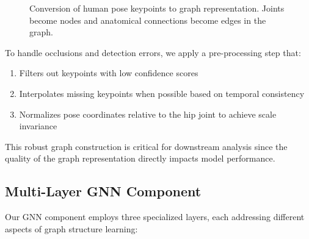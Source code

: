 \documentclass[conference]{IEEEtran}
\begin{document}
\begin{figure*}[htbp]
\caption{Conversion of human pose keypoints to graph representation. Joints become nodes and anatomical connections become edges in the graph.}
\label{fig:pose_graph}
\end{figure*}

To handle occlusions and detection errors, we apply a pre-processing step that:
\begin{enumerate}
    \item Filters out keypoints with low confidence scores
    \item Interpolates missing keypoints when possible based on temporal consistency
    \item Normalizes pose coordinates relative to the hip joint to achieve scale invariance
\end{enumerate}

This robust graph construction is critical for downstream analysis since the quality of the graph representation directly impacts model performance.

\subsection{Multi-Layer GNN Component}
Our GNN component employs three specialized layers, each addressing different aspects of graph structure learning:
\end{document}

